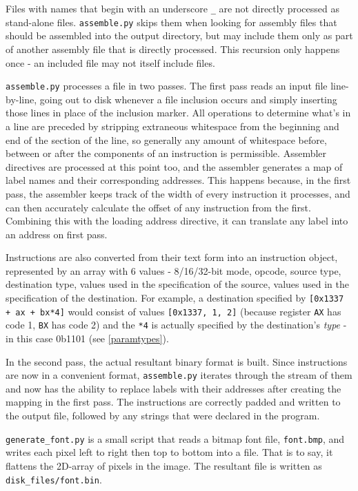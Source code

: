\documentclass[12pt,a4paper]{report}
\begin{document}
Files with names that begin with an underscore \texttt{\_} are not directly processed as stand-alone files. \texttt{assemble.py} skips them when looking for assembly files that should be assembled into the output directory, but may include them only as part of another assembly file that is directly processed. This recursion only happens once - an included file may not itself include files.

\texttt{assemble.py} processes a file in two passes. The first pass reads an input file line-by-line, going out to disk whenever a file inclusion occurs and simply inserting those lines in place of the inclusion marker. All operations to determine what's in a line are preceded by stripping extraneous whitespace from the beginning and end of the section of the line, so generally any amount of whitespace before, between or after the components of an instruction is permissible. Assembler directives are processed at this point too, and the assembler generates a map of label names and their corresponding addresses. This happens because, in the first pass, the assembler keeps track of the width of every instruction it processes, and can then accurately calculate the offset of any instruction from the first. Combining this with the loading address directive, it can translate any label into an address on first pass.

Instructions are also converted from their text form into an instruction object, represented by an array with 6 values - 8/16/32-bit mode, opcode, source type, destination type, values used in the specification of the source, values used in the specification of the destination. For example, a destination specified by \texttt{[0x1337 + ax + bx*4]} would consist of values \texttt{[0x1337, 1, 2]} (because register \texttt{AX} has code 1, \texttt{BX} has code 2) and the \texttt{*4} is actually specified by the destination's \emph{type} - in this case 0b1101 (see \autoref{paramtypes}).

In the second pass, the actual resultant binary format is built. Since instructions are now in a convenient format, \texttt{assemble.py} iterates through the stream of them and now has the ability to replace labels with their addresses after creating the mapping in the first pass. The instructions are correctly padded and written to the output file, followed by any strings that were declared in the program.

\texttt{generate\_font.py} is a small script that reads a bitmap font file, \texttt{font.bmp}, and writes each pixel left to right then top to bottom into a file. That is to say, it flattens the 2D-array of pixels in the image. The resultant file is written as \texttt{disk\_files/font.bin}.
\end{document}
